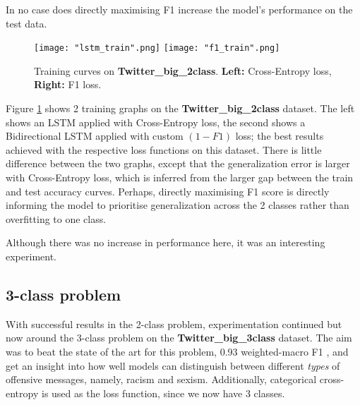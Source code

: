\documentclass[12pt,a4paper]{article}
\begin{document}
In no case does directly maximising F1 increase the model's performance on the test data. 

\begin{figure}[H]
	\centering
	\texttt{[image: "lstm\_train".png]} \hfill
	\texttt{[image: "f1\_train".png]}\hfill
	
	\caption{Training curves on \textbf{Twitter\_big\_2class}. \textbf{Left:} Cross-Entropy loss, \textbf{Right:} F1 loss.}
	\label{train:train2}
\end{figure}

Figure \ref{train:train2} shows 2 training graphs on the \textbf{Twitter\_big\_2class} dataset. The left shows an LSTM applied with Cross-Entropy loss, the second shows a Bidirectional LSTM applied with custom $(1-F1)$ loss; the best results achieved with the respective loss functions on this dataset. There is little difference between the two graphs, except that the generalization error is larger with Cross-Entropy loss, which is inferred from the larger gap between the train and test accuracy curves. Perhaps, directly maximising F1 score is directly informing the model to prioritise generalization across the 2 classes rather than overfitting to one class.

Although there was no increase in performance here, it was an interesting experiment.

\subsection{3-class problem}

With successful results in the 2-class problem, experimentation continued but now around the 3-class problem on the \textbf{Twitter\_big\_3class} dataset. The aim was to beat the state of the art for this problem, 0.93 weighted-macro F1 \cite{Badjatiya}, and get an insight into how well models can distinguish between different \textit{types} of offensive messages, namely, racism and sexism. Additionally, categorical cross-entropy is used as the loss function, since we now have 3 classes.
\end{document}
